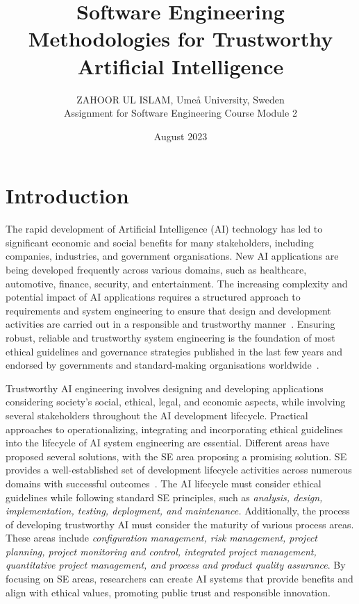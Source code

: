 \documentclass[a4paper,11pt]{article}
\begin{document}
\title{Software Engineering Methodologies for Trustworthy Artificial Intelligence}
\author{ZAHOOR UL ISLAM, Umeå University, Sweden \\Assignment for Software Engineering Course Module 2}
\date{August 2023}
\maketitle

\section{Introduction}

The rapid development of Artificial Intelligence (AI) technology has led to significant economic and social benefits for many stakeholders, including companies, industries, and government organisations. New AI applications are being developed frequently across various domains, such as healthcare, automotive, finance, security, and entertainment. The increasing complexity and potential impact of AI applications requires a structured approach to requirements and system engineering to ensure that design and development activities are carried out in a responsible and trustworthy manner~\cite{dignum2019responsible}. Ensuring robust, reliable and trustworthy system engineering is the foundation of most ethical guidelines and governance strategies published in the last few years and endorsed by governments and standard-making organisations worldwide~\cite{design2019vision,chatila2018ethically}.

Trustworthy AI engineering involves designing and developing applications considering society's social, ethical, legal, and economic aspects, while involving several stakeholders throughout the AI development lifecycle. Practical approaches to operationalizing, integrating and incorporating ethical guidelines into the lifecycle of AI system engineering are essential. Different areas have proposed several solutions, with the SE area proposing a promising solution. SE provides a well-established set of development lifecycle activities across numerous domains with successful outcomes~\cite{pressman2005software, sedelmaier2014software, abran2004software, mcmanus2004stakeholder}. The AI lifecycle must consider ethical guidelines while following standard SE principles, such as \textit{analysis, design, implementation, testing, deployment, and maintenance.} Additionally, the process of developing trustworthy AI must consider the maturity of various process areas. These areas include \textit{configuration management, risk management, project planning, project monitoring and control, integrated project management, quantitative project management, and process and product quality assurance}. By focusing on SE areas, researchers can create AI systems that provide benefits and align with ethical values, promoting public trust and responsible innovation. 
\end{document}

